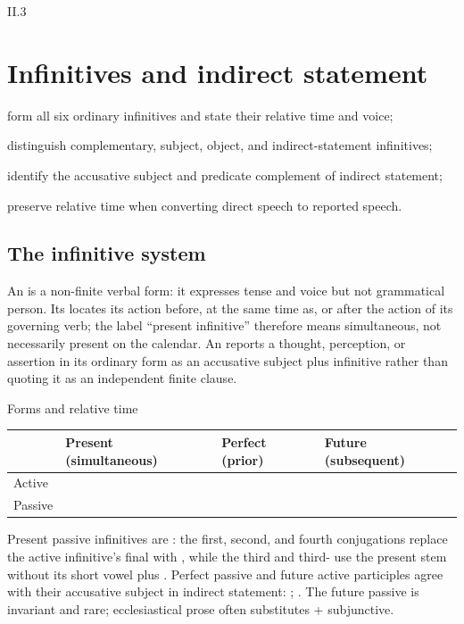 \begin{courseunit}{II.3}
\chapter{Infinitives and indirect statement}

\begin{learningobjectives}
  \item form all six ordinary infinitives and state their relative time and voice;
  \item distinguish complementary, subject, object, and indirect-statement infinitives;
  \item identify the accusative subject and predicate complement of indirect statement;
  \item preserve relative time when converting direct speech to reported speech.
\end{learningobjectives}

\section{The infinitive system}

An  is a non-finite verbal form: it expresses tense and voice
but not grammatical person. Its  locates its action before,
at the same time as, or after the action of its governing verb; the label
``present infinitive'' therefore means simultaneous, not necessarily present
on the calendar. An  reports a thought, perception,
or assertion in its ordinary form as an accusative subject plus infinitive rather than quoting it as
an independent finite clause.

\begin{grammarbox}{Forms and relative time}
\begin{center}
\begin{tabular}{@{}llll@{}}
\toprule
& Present (simultaneous) & Perfect (prior) & Future (subsequent)\\ \midrule
Active & \Latin{amare} & \Latin{amavisse} & \Latin{amaturus, -a, -um esse}\\
Passive & \Latin{amari} & \Latin{amatus, -a, -um esse} & \Latin{amatum iri}\\
\bottomrule
\end{tabular}
\end{center}

Present passive infinitives are : the first, second,
and fourth conjugations replace the active infinitive's final  with , while
the third and third- use the present stem without its short vowel plus .
Perfect passive and future active participles agree
with their accusative subject in indirect statement: ;
.  The future passive  is invariant and
rare; ecclesiastical prose often substitutes  + subjunctive.


\end{grammarbox}
\end{courseunit}

